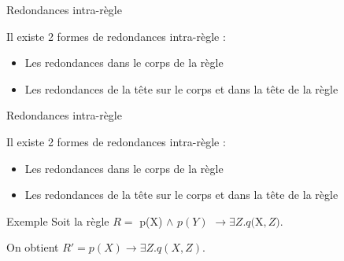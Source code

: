 \begin{comment}



\begin{frame}{Redondances intra-règle}
     Deux formes de redondances statiques étudiées :

    \begin{itemize}
    \color{red}
        \item Les redondances intra-règle 
        \color{black}
        \item Les redondances inter-règle 
       
    \end{itemize}
\end{frame}{}

\end{comment}

\begin{frame}{Redondances intra-règle}

    Il existe 2 formes de redondances intra-règle :

    \begin{itemize}
        \item Les redondances dans le corps de la règle 
        \item Les redondances de la tête sur le corps et dans la tête de la règle
    \end{itemize}
    
   
\end{frame}

\begin{frame}{Redondances intra-règle}

    Il existe 2 formes de redondances intra-règle :

    \begin{itemize}
        \color{red}
        \item Les redondances dans le corps de la règle 
        \color{black}
        \item Les redondances de la tête sur le corps et dans la tête de la règle
    \end{itemize}
    
   \begin{block}{Exemple}
        Soit la règle $R = $ \color{blue}p(X)\color{black} $\land$ \color{red}$ p(Y) $\color{black} $\xrightarrow{} \exists Z.q($\color{blue}X\color{black}$,Z)$.
    \end{block}

On obtient $R' = p(X) \xrightarrow{} \exists Z.q(X,Z)$.
   
\end{frame}


